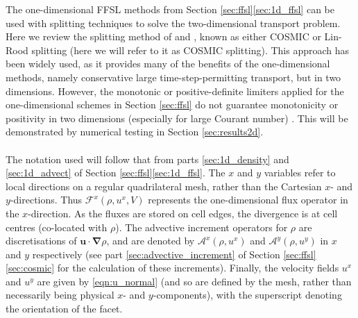\documentclass{ametsocV6.1}
\begin{document}
The one-dimensional FFSL methods from Section \ref{sec:ffsl}\ref{sec:1d_ffsl} can be used with splitting techniques to solve the two-dimensional transport problem. Here we review the splitting method of \citet{leonard1996cosmic} and \citet{lin1996ffsl}, known as either COSMIC or Lin-Rood splitting (here we will refer to it as COSMIC splitting). This approach has been widely used, as it provides many of the benefits of the one-dimensional methods, namely conservative large time-step-permitting transport, but in two dimensions. However, the monotonic or positive-definite limiters applied for the one-dimensional schemes in Section \ref{sec:ffsl} do not guarantee monotonicity or positivity in two dimensions (especially for large Courant number) \citep{lin1996ffsl,leonard1996cosmic}.
This will be demonstrated by numerical testing in Section \ref{sec:results2d}. \\ 
\\
The notation used will follow that from parts \ref{sec:1d_density} and \ref{sec:1d_advect} of Section \ref{sec:ffsl}\ref{sec:1d_ffsl}. 
The $x$ and $y$ variables refer to local directions on a regular quadrilateral mesh, rather than the Cartesian $x$- and $y$-directions. Thus
$\mathcal{F}^x(\rho,u^x,V)$ represents the one-dimensional flux operator in the $x$-direction. 
As the fluxes are stored on cell edges, the divergence is at cell centres (co-located with $\rho$).
The advective increment operators for $\rho$ are discretisations of $\bm{u\cdot\nabla}\rho$, and are denoted by $\mathcal{A}^x(\rho,u^x)$ and $\mathcal{A}^y(\rho,u^y)$ in $x$ and $y$ respectively  (see part \ref{sec:advective_increment} of Section \ref{sec:ffsl}\ref{sec:cosmic} for the calculation of these increments).
Finally, the velocity fields $u^x$ and $u^y$ are given by \eqref{eqn:u_normal} (and so are defined by the mesh, rather than necessarily being physical $x$- and $y$-components), with the superscript denoting the orientation of the facet.
\end{document}
